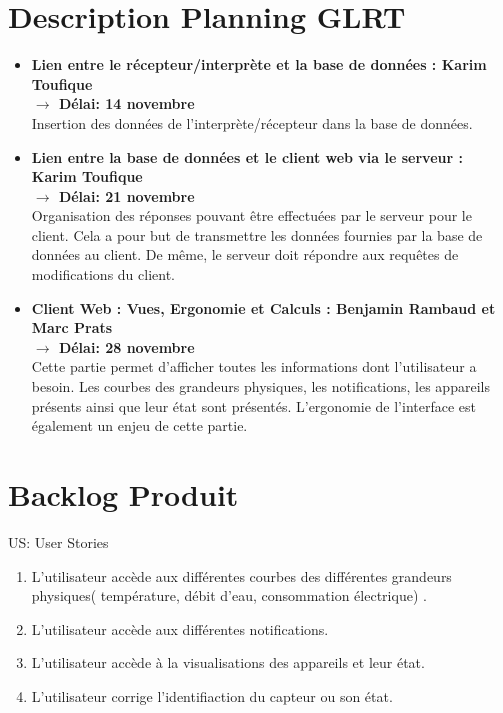 \documentclass[10pt,a4paper]{article}
\begin{document}

\section{Description Planning GLRT}

\begin{itemize}[label=$\bullet$]
    \setlength\itemsep{1em}
    
    \item \textbf{ Lien entre le récepteur/interprète et la base de données : Karim Toufique
    \\ $\rightarrow$ Délai: 14 novembre}\\
    Insertion des données de l'interprète/récepteur dans la base de données. 
    
    \item \textbf{Lien entre la base de données et le client web via le serveur : Karim Toufique 
    \\$\rightarrow$ Délai: 21 novembre}\\
    Organisation des réponses pouvant être effectuées par le serveur pour le client. Cela a pour but de transmettre les données fournies par la base de données au client. De même, le serveur doit répondre aux requêtes de modifications du client.
    
    \item \textbf{Client Web : Vues, Ergonomie et Calculs : Benjamin Rambaud et Marc Prats 
    \\$\rightarrow$ Délai: 28 novembre}\\
    Cette partie permet d'afficher toutes les informations dont l'utilisateur a besoin. Les courbes des grandeurs physiques, les notifications, les appareils présents ainsi que leur état sont présentés. L'ergonomie de l'interface est également un enjeu de cette partie.    
\end{itemize}


\section{Backlog Produit}

US: User Stories

\begin{enumerate}[label=\bfseries US\arabic* :]
    \item L'utilisateur accède aux différentes courbes des différentes grandeurs physiques( température, débit d'eau, consommation électrique) .
    \item L'utilisateur accède aux différentes notifications.
    \item L'utilisateur accède à la visualisations des appareils et leur état.
    \item L'utilisateur corrige l'identifiaction du capteur ou son état.
\end{enumerate}
\end{document}
